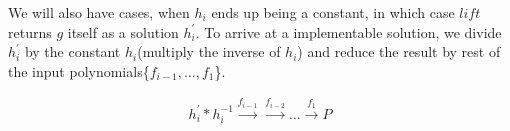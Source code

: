 We will also have cases, when $h_i$ ends up being a constant, in which case $lift$ returns $g$ itself as a solution $h_i^{'}$. To arrive at a implementable solution, we divide $h_i^{'}$ by the constant $h_i$(multiply the inverse of $h_i$) and reduce the result by rest of the input polynomials\{$f_{i-1},\dots,f_1$\}. 

\begin{align}
h_i^{'}*h_i^{-1}\xrightarrow[]{f_{i-1}}\xrightarrow[]{f_{i-2}}\dots\xrightarrow[]{f_1}P
\end{align}